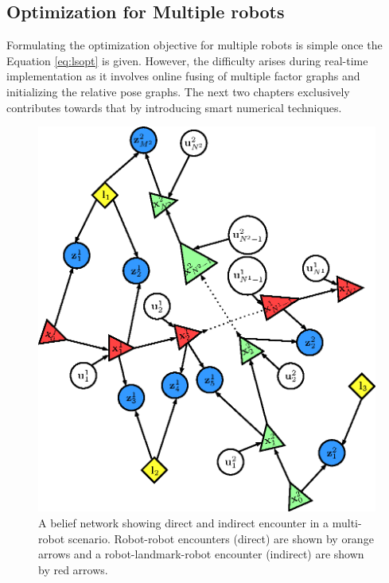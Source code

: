 \subsection{Optimization for Multiple robots}
Formulating the optimization objective for multiple robots is simple once the Equation \ref{eq:lsopt} is given. However, the difficulty arises during real-time implementation as it involves online fusing of multiple factor graphs and initializing the relative pose graphs. The next two chapters exclusively contributes towards that by introducing smart numerical techniques. 
\begin{figure}
\centering
\includegraphics{Chapters/figures2/multi_robot_belief_network}
\caption{A belief network showing direct and indirect encounter in a multi-robot scenario. Robot-robot encounters (direct) are shown by orange arrows and a robot-landmark-robot encounter (indirect) are shown by red arrows.}
\label{fig:multi_bel_net}
\end{figure}
